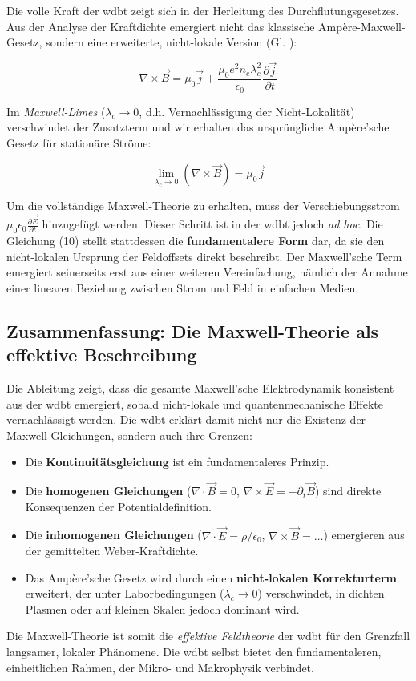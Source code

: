 Die volle Kraft der \gls{wdbt} zeigt sich in der Herleitung des Durchflutungsgesetzes. Aus der Analyse der Kraftdichte emergiert nicht das klassische Ampère-Maxwell-Gesetz, sondern eine erweiterte,
nicht-lokale Version (Gl. ):

\begin{equation}
    \nabla \times \vec{B} = \mu_0 \vec{j} + \frac{\mu_0 e^2 n_e \lambda_c^2}{\epsilon_0} \frac{\partial \vec{j}}{\partial t}
\end{equation}

Im \textit{Maxwell-Limes} ($\lambda_c \rightarrow 0$, d.h. Vernachlässigung der Nicht-Lokalität) verschwindet der Zusatzterm und wir erhalten das ursprüngliche Ampère'sche Gesetz für stationäre Ströme:

\begin{equation}
    \lim_{\lambda_c \to 0} \left( \nabla \times \vec{B} \right) = \mu_0 \vec{j}
\end{equation}

Um die vollständige Maxwell-Theorie zu erhalten, muss der Verschiebungsstrom $\mu_0 \epsilon_0 \frac{\partial \vec{E}}{\partial t}$ hinzugefügt werden. Dieser Schritt ist in der \gls{wdbt}
jedoch \textit{ad hoc}. Die Gleichung (10) stellt stattdessen die \textbf{fundamentalere Form} dar, da sie den nicht-lokalen Ursprung der Feldoffsets direkt beschreibt. Der Maxwell'sche Term
emergiert seinerseits erst aus einer weiteren Vereinfachung, nämlich der Annahme einer linearen Beziehung zwischen Strom und Feld in einfachen Medien.

\subsection{Zusammenfassung: Die Maxwell-Theorie als effektive Beschreibung}

Die Ableitung zeigt, dass die gesamte Maxwell'sche Elektrodynamik konsistent aus der \gls{wdbt} emergiert, sobald nicht-lokale und quantenmechanische Effekte vernachlässigt werden. Die \gls{wdbt}
erklärt damit nicht nur die Existenz der Maxwell-Gleichungen, sondern auch ihre Grenzen:

\begin{itemize}
    \item Die \textbf{Kontinuitätsgleichung} ist ein fundamentaleres Prinzip.
    \item Die \textbf{homogenen Gleichungen} ($\nabla \cdot \vec{B} = 0$, $\nabla \times \vec{E} = -\partial_t \vec{B}$) sind direkte Konsequenzen der Potentialdefinition.
    \item Die \textbf{inhomogenen Gleichungen} ($\nabla \cdot \vec{E} = \rho/\epsilon_0$, $\nabla \times \vec{B} = \ldots$) emergieren aus der gemittelten Weber-Kraftdichte.
    \item Das Ampère'sche Gesetz wird durch einen \textbf{nicht-lokalen Korrekturterm} erweitert, der unter Laborbedingungen ($\lambda_c \rightarrow 0$) verschwindet, in dichten Plasmen oder auf kleinen Skalen jedoch dominant wird.
\end{itemize}

Die Maxwell-Theorie ist somit die \textit{effektive Feldtheorie} der \gls{wdbt} für den Grenzfall langsamer, lokaler Phänomene. Die \gls{wdbt} selbst bietet den fundamentaleren, einheitlichen Rahmen,
der Mikro- und Makrophysik verbindet.
